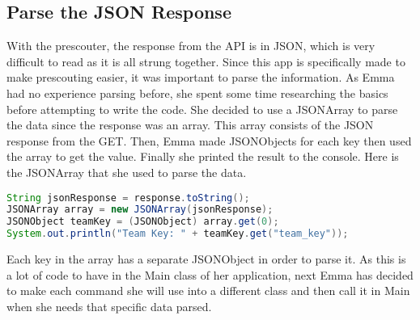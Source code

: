 \documentclass{article}
\begin{document}
\subsection{Parse the JSON Response}
With the prescouter, the response from the API is in JSON, which is very difficult to read as it is all strung together. Since this app is specifically made to make prescouting easier, it was important to parse the information. As Emma had no experience parsing before, she spent some time researching the basics before attempting to write the code. She decided to use a JSONArray to parse the data since the response was an array. This array consists of the JSON response from the GET. Then, Emma made JSONObjects for each key then used the array to get the value. Finally she printed the result to the console. Here is the JSONArray that she used to parse the data. 

\begin{lstlisting}[language=Java]
String jsonResponse = response.toString();
JSONArray array = new JSONArray(jsonResponse);
JSONObject teamKey = (JSONObject) array.get(0);
System.out.println("Team Key: " + teamKey.get("team_key"));

\end{lstlisting}

Each key in the array has a separate JSONObject in order to parse it. As this is a lot of code to have in the Main class of her application, next Emma has decided to make each command she will use into a different class and then call it in Main when she needs that specific data parsed. 
\end{document}
